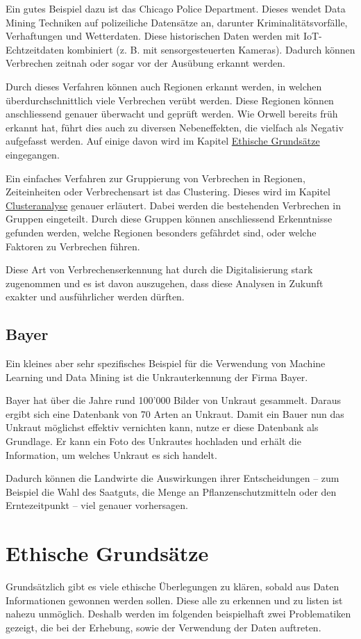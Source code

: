 Ein gutes Beispiel dazu ist das Chicago Police Department. Dieses wendet Data Mining Techniken auf polizeiliche Datensätze an, darunter Kriminalitätsvorfälle, Verhaftungen und Wetterdaten. Diese historischen Daten werden mit IoT-Echtzeitdaten kombiniert (z. B. mit sensorgesteuerten Kameras). Dadurch können Verbrechen zeitnah oder sogar vor der Ausübung erkannt werden.

Durch dieses Verfahren können auch Regionen erkannt werden, in welchen überdurchschnittlich viele Verbrechen verübt werden. Diese Regionen können anschliessend genauer überwacht und geprüft werden.
Wie Orwell bereits früh erkannt hat, führt dies auch zu diversen Nebeneffekten, die vielfach als Negativ aufgefasst werden. Auf einige davon wird im Kapitel \hyperref[sec:ethics]{Ethische Grundsätze} eingegangen.\cite{crime-prevention}

Ein einfaches Verfahren zur Gruppierung von Verbrechen in Regionen, Zeiteinheiten oder Verbrechensart ist das Clustering. Dieses wird im Kapitel \hyperref[sec:clustering]{Clusteranalyse} genauer erläutert. Dabei werden die bestehenden Verbrechen in Gruppen eingeteilt. Durch diese Gruppen können anschliessend Erkenntnisse gefunden werden, welche Regionen besonders gefährdet sind, oder welche Faktoren zu Verbrechen führen.\cite{crime}

Diese Art von Verbrechenserkennung hat durch die Digitalisierung stark zugenommen und es ist davon auszugehen, dass diese Analysen in Zukunft exakter und ausführlicher werden dürften.

\subsection{Bayer}
Ein kleines aber sehr spezifisches Beispiel für die Verwendung von Machine Learning und Data Mining ist die Unkrauterkennung der Firma Bayer.

Bayer hat über die Jahre rund 100'000 Bilder von Unkraut gesammelt. Daraus ergibt sich eine Datenbank von 70 Arten an Unkraut.
Damit ein Bauer nun das Unkraut möglichst effektiv vernichten kann, nutze er diese Datenbank als Grundlage. Er kann ein Foto des Unkrautes hochladen und erhält die Information, um welches Unkraut es sich handelt.

Dadurch können die Landwirte die Auswirkungen ihrer Entscheidungen – zum Beispiel die Wahl des Saatguts, die Menge an Pflanzenschutzmitteln oder den Erntezeitpunkt – viel genauer vorhersagen.\cite{bayer}

\clearpage
\section{Ethische Grundsätze}
\label{sec:ethics}
Grundsätzlich gibt es viele ethische Überlegungen zu klären, sobald aus Daten Informationen gewonnen werden sollen. Diese alle zu erkennen und zu listen ist nahezu unmöglich. Deshalb werden im folgenden beispielhaft zwei Problematiken gezeigt, die bei der Erhebung, sowie der Verwendung der Daten auftreten. \cite{ethics}

